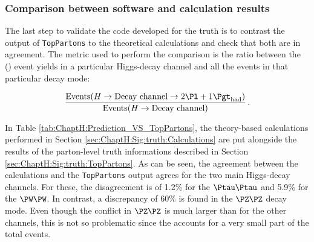 \subsubsection{Comparison between software and calculation results}
The last step to validate the code developed for the truth
is to contrast the output of \texttt{TopPartons} to the theoretical calculations and check that
both are in agreement.
The metric used to perform the comparison is the ratio between the \tHq(\dileptau) event yields
 in a particular Higgs-decay channel and all the events in that particular decay mode:  

\begin{equation*}
    \frac{\text{Events}(H \rightarrow \text{Decay channel} \rightarrow  \dileptau)}{\text{Events}(H \rightarrow \text{Decay channel)}}\, .
\end{equation*}

In Table \ref{tab:ChaptH:Prediction_VS_TopPartons}, the theory-based calculations
performed in Section \ref{sec:ChaptH:Sig:truth:Calculations} are put alongside 
the results of the parton-level truth informations described in Section \ref{sec:ChaptH:Sig:truth:TopPartons}.
As can be seen, the agreement between the calculations and the \texttt{TopPartons} output agrees for
the two main Higgs-decay channels. For these, the disagreement is of 1.2\% for the $\Ptau\Ptau$  and 
5.9\% for the $\PW \PW$. In contrast, a discrepancy of 60\% is found in the $\PZ \PZ$ decay mode. 
Even though the conflict in $\PZ \PZ$ is much larger than for the other channels, this is not so problematic
since the \HZZ accounts for a very small part of the total \tHq events. 

